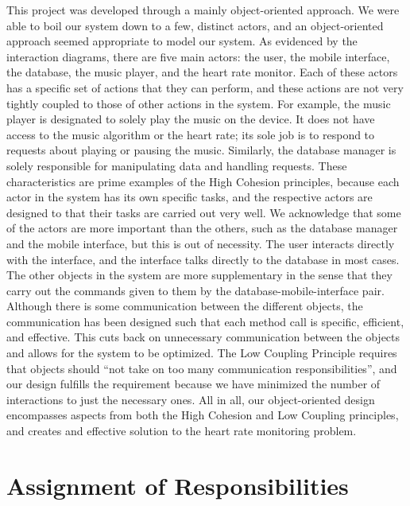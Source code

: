 \documentclass[letterpaper,english, 12pt]{scrreprt}
\begin{document}
This project was developed through a mainly object-oriented approach. We were able to boil our system down to a few, distinct actors, and an object-oriented approach seemed appropriate to model our system. As evidenced by the interaction diagrams, there are five main actors: the user, the mobile interface, the database, the music player, and the heart rate monitor. Each of these actors has a specific set of actions that they can perform, and these actions are not very tightly coupled to those of other actions in the system. For example, the music player is designated to solely play the music on the device. It does not have access to the music algorithm or the heart rate; its sole job is to respond to requests about playing or pausing the music. Similarly, the database manager is solely responsible for manipulating data and handling requests. These characteristics are prime examples of the High Cohesion principles, because each actor in the system has its own specific tasks, and the respective actors are designed to that their tasks are carried out very well. We acknowledge that some of the actors are more important than the others, such as the database manager and the mobile interface, but this is out of necessity. The user interacts directly with the interface, and the interface talks directly to the database in most cases. The other objects in the system are more supplementary in the sense that they carry out the commands given to them by the database-mobile-interface pair. Although there is some communication between the different objects, the communication has been designed such that each method call is specific, efficient, and effective. This cuts back on unnecessary communication between the objects and allows for the system to be optimized. The Low Coupling Principle requires that objects should ``not take on too many communication responsibilities'', and our design fulfills the requirement because we have minimized the number of interactions to just the necessary ones. All in all, our object-oriented design encompasses aspects from both the High Cohesion and Low Coupling principles, and creates and effective solution to the heart rate monitoring problem.

\section{Assignment of Responsibilities}
\end{document}
